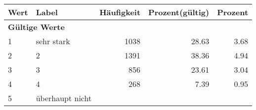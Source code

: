      \begin{longtable}{lXrrr}
     \toprule
     \textbf{Wert} & \textbf{Label} & \textbf{Häufigkeit} & \textbf{Prozent(gültig)} & \textbf{Prozent} \\
     \endhead
     \midrule
     \multicolumn{5}{l}{\textbf{Gültige Werte}}\\

     1 &
     \multicolumn{1}{X}{ sehr stark   } &


       \num{1038} &
       \num[round-mode=places,round-precision=2]{28,63} &
         \num[round-mode=places,round-precision=2]{3,68} \\

     2 &
     \multicolumn{1}{X}{ 2   } &


       \num{1391} &
       \num[round-mode=places,round-precision=2]{38,36} &
         \num[round-mode=places,round-precision=2]{4,94} \\

     3 &
     \multicolumn{1}{X}{ 3   } &


       \num{856} &
       \num[round-mode=places,round-precision=2]{23,61} &
         \num[round-mode=places,round-precision=2]{3,04} \\

     4 &
     \multicolumn{1}{X}{ 4   } &


       \num{268} &
       \num[round-mode=places,round-precision=2]{7,39} &
         \num[round-mode=places,round-precision=2]{0,95} \\

     5 &
     \multicolumn{1}{X}{ überhaupt nicht   } &



\end{longtable}
